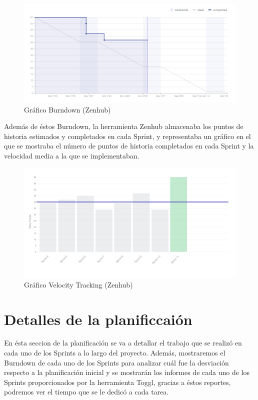 \documentclass[11pt,openany]{book}
\begin{document}
\begin{figure}[H]
\centering
\includegraphics[totalheight=5cm]{zenhub_burndown.png}
\caption{Gráfico Burndown (Zenhub)}
\end{figure}
\par\bigskip 
\noindent

Además de éstos Burndown, la herramienta Zenhub almacenaba los puntos de historia estimados y completados en cada Sprint, y representaba un gráfico en el que se mostraba el número de puntos de historia completados en cada Sprint y la velocidad media a la que se implementaban.

\begin{figure}[H]
\centering
\includegraphics[totalheight=5cm]{zenhub_velocity.png}
\caption{Gráfico Velocity Tracking (Zenhub)}
\end{figure}
\par\bigskip 
\noindent

\section{Detalles de la planificcaión}

En ésta seccion de la planificación se va a detallar el trabajo que se realizó en cada uno de los Sprints a lo largo del proyecto. Además, mostraremos el Burndown de cada uno de los Sprints para analizar cuál fue la desviación respecto a la planificación inicial y se mostrarán los informes de cada uno de los Sprints proporcionados por la herramienta Toggl, gracias a éstos reportes, podremos ver el tiempo que se le dedicó a cada tarea.
\end{document}
